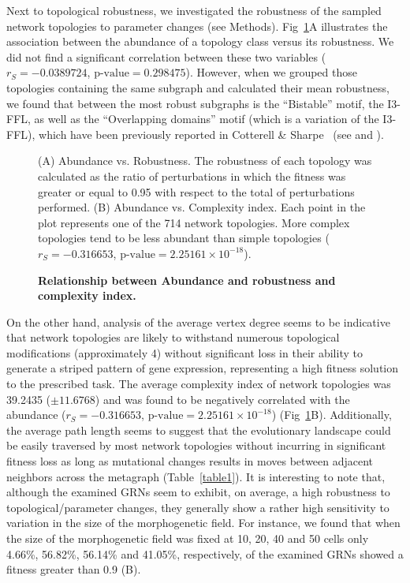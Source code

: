 \documentclass[10pt,letterpaper]{article}
\begin{document}
Next to topological robustness, we investigated the robustness of the sampled
network topologies to parameter changes (see Methods). Fig~\ref{fig:ab-rob}A
illustrates the association between the abundance of a topology class versus its
robustness. We did not find a significant correlation between
these two variables ($r_S = −0.0389724$, $\text{p-value} = 0.298475$).
However, when we grouped those topologies containing
the same subgraph and calculated their mean robustness, we found that between
the most robust subgraphs is the ``Bistable'' motif, the I3-FFL, as well as
the ``Overlapping domains'' motif (which is a variation of the I3-FFL), which
have been previously reported in Cotterell \& Sharpe~\cite{Cotterell2010}
(see  and ).

\begin{figure}[!h]
 \caption{\bf Relationship between Abundance and robustness and complexity
 index.} (A) Abundance vs. Robustness. The robustness of each topology was
 calculated as the ratio of perturbations in which the fitness was greater or
 equal to 0.95 with respect to the total of perturbations performed.
 (B) Abundance vs. Complexity index. Each point in the plot represents one of
 the 714 network topologies. More complex topologies tend to be less abundant
 than simple topologies
 ($r_S = -0.316653$, $\text{p-value} = 2.25161\times10^{-18}$).
 \label{fig:ab-rob}
\end{figure}

On the other hand, analysis of the average vertex degree seems to be indicative
that network topologies are likely to withstand numerous topological
modifications (approximately 4) without significant loss in their ability to
generate a striped pattern of gene expression, representing a high fitness
solution to the prescribed task. The average complexity index of network
topologies was 39.2435 ($\pm 11.6768$) and was found to be negatively
correlated with the abundance ($r_S = -0.316653$, $\text{p-value} =
2.25161\times10^{-18}$) (Fig~\ref{fig:ab-rob}B).
Additionally, the average path length seems
to suggest that the evolutionary landscape could be easily traversed by
most network topologies without incurring in significant fitness loss as long
as mutational changes results in moves between adjacent neighbors across
the metagraph (Table~\ref{table1}). It is interesting to note that,
although the examined GRNs seem to exhibit, on average, a high robustness to
topological/parameter changes, they generally show a rather high sensitivity to
variation in the size of the morphogenetic field. For instance, we found that
when the size of the morphogenetic field was fixed at 10, 20, 40 and 50 cells
only 4.66\%, 56.82\%, 56.14\% and 41.05\%, respectively, of the examined
GRNs showed a fitness greater than 0.9 (B).
\end{document}
